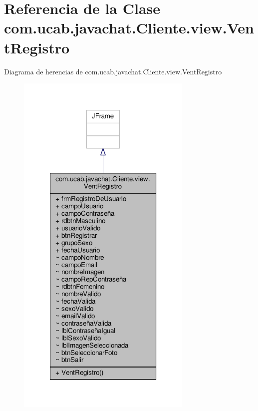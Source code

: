 \hypertarget{classcom_1_1ucab_1_1javachat_1_1_cliente_1_1view_1_1_vent_registro}{\section{Referencia de la Clase com.\-ucab.\-javachat.\-Cliente.\-view.\-Vent\-Registro}
\label{classcom_1_1ucab_1_1javachat_1_1_cliente_1_1view_1_1_vent_registro}
}


Diagrama de herencias de com.\-ucab.\-javachat.\-Cliente.\-view.\-Vent\-Registro\nopagebreak
\begin{figure}[H]
\begin{center}
\leavevmode
\includegraphics[width=238pt]{classcom_1_1ucab_1_1javachat_1_1_cliente_1_1view_1_1_vent_registro__inherit__graph}
\end{center}
\end{figure}


